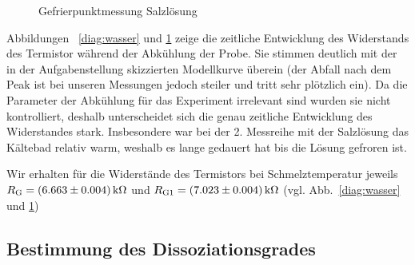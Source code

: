 \begin{figure}    
    
    \caption{Gefrierpunktmessung Salzlösung}
    \label{diag:salz}
\end{figure}

Abbildungen ~\ref{diag:wasser} und \ref{diag:salz} zeige die zeitliche Entwicklung des Widerstands des Termistor während der Abkühlung der Probe. Sie stimmen deutlich mit der in der Aufgabenstellung skizzierten Modellkurve überein (der Abfall nach dem Peak ist bei unseren Messungen jedoch steiler und tritt sehr plötzlich ein). 
Da die Parameter der Abkühlung für das Experiment irrelevant sind wurden sie nicht kontrolliert, deshalb unterscheidet sich die genau zeitliche Entwicklung des Widerstandes stark. Insbesondere war bei der 2. Messreihe mit der Salzlösung das Kältebad relativ warm, weshalb es lange gedauert hat bis die Lösung gefroren ist.

Wir erhalten für die Widerstände des Termistors bei Schmelztemperatur jeweils $R_\mathrm{G} = \unit[(6.663 \pm 0.004)]{k\Omega}$ und $R_\mathrm{G1} = \unit[(7.023 \pm 0.004)]{k\Omega}$ (vgl. Abb.~\ref{diag:wasser} und \ref{diag:salz})

\subsection{Bestimmung des Dissoziationsgrades}


